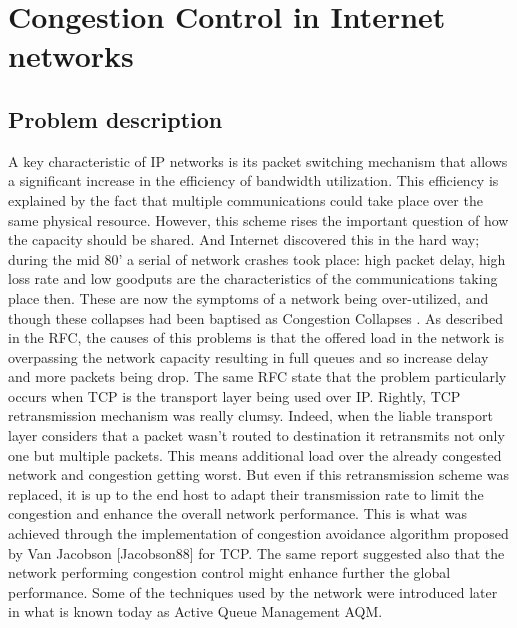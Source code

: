 \section{Congestion Control in Internet networks}
\subsection{Problem description}
A key characteristic of IP networks is its packet switching mechanism that allows a significant increase in the efficiency of bandwidth utilization. This efficiency is explained by the fact that multiple communications could take place over the same physical resource. However, this scheme rises the important question of how the capacity should be shared. And Internet discovered this in the hard way; during the mid 80' a serial of network crashes took place: high packet delay, high loss rate and  low  goodputs are the characteristics of the communications taking place then. These are now the symptoms of a network being over-utilized, and though these collapses had been baptised as Congestion Collapses \cite{RFC896}. 
As described in the RFC, the causes of this problems is that the offered load in the network is overpassing the network capacity resulting in full queues and so increase delay and more packets being drop. The same RFC state that the problem particularly occurs when TCP is the transport layer being used over IP. Rightly, TCP retransmission mechanism was really clumsy. Indeed, when the liable transport layer considers that a packet wasn't routed to destination it retransmits not only one but multiple packets. This means additional load over the already congested network and congestion getting worst. But even if this retransmission scheme was replaced, it is up to the end host to adapt their transmission rate to limit the congestion and enhance the overall network performance. This is what was achieved through the implementation of congestion avoidance algorithm proposed by Van Jacobson [Jacobson88] for TCP. The same report suggested also that the network performing congestion control might enhance further the global performance. Some of the techniques used by the network were introduced later in what is known today as Active Queue Management AQM.
